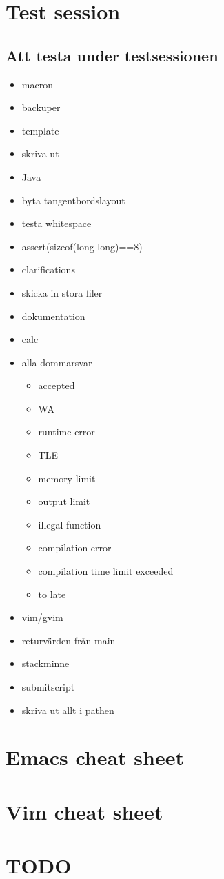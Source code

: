 
\appendix

\chapter{Test session}

\section{Att testa under testsessionen}
\begin{itemize}
	\item macron
	\item backuper
	\item template
	\item skriva ut
	\item Java
	\item byta tangentbordslayout
	\item testa whitespace
	\item assert(sizeof(long long)==8)
	\item clarifications
	\item skicka in stora filer
	\item dokumentation
	\item calc
	\item alla dommarsvar
	\begin{itemize}
 			\item accepted
 			\item WA
 			\item runtime error
 			\item TLE
 			\item memory limit
 			\item output limit
 			\item illegal function
 			\item compilation error
 			\item compilation time limit exceeded
 			\item to late
		\end{itemize}
	\item vim/gvim
	\item returvärden från main
	\item stackminne
	\item submitscript
	\item skriva ut allt i pathen
\end{itemize}

\chapter{Emacs cheat sheet}

\chapter{Vim cheat sheet}

\chapter{TODO}
